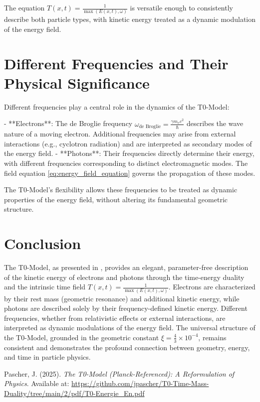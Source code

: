 \documentclass[12pt,a4paper]{article}
\begin{document}
	The equation \( T(x,t) = \frac{1}{\max(E(x,t), \omega)} \) is versatile enough to consistently describe both particle types, with kinetic energy treated as a dynamic modulation of the energy field.
	
	\section{Different Frequencies and Their Physical Significance}
	\label{sec:frequencies}
	
	Different frequencies play a central role in the dynamics of the T0-Model:
	
	- **Electrons**: The de Broglie frequency \(\omega_{\text{de Broglie}} = \frac{\gamma m_e c^2}{\hbar}\) describes the wave nature of a moving electron. Additional frequencies may arise from external interactions (e.g., cyclotron radiation) and are interpreted as secondary modes of the energy field.
	- **Photons**: Their frequencies directly determine their energy, with different frequencies corresponding to distinct electromagnetic modes. The field equation \eqref{eq:energy_field_equation} governs the propagation of these modes.
	
	The T0-Model's flexibility allows these frequencies to be treated as dynamic properties of the energy field, without altering its fundamental geometric structure.
	
	\section{Conclusion}
	\label{sec:summary}
	
	The T0-Model, as presented in \cite{pascher_t0_energy_2025}, provides an elegant, parameter-free description of the kinetic energy of electrons and photons through the time-energy duality and the intrinsic time field \( T(x,t) = \frac{1}{\max(E(x,t), \omega)} \). Electrons are characterized by their rest mass (geometric resonance) and additional kinetic energy, while photons are described solely by their frequency-defined kinetic energy. Different frequencies, whether from relativistic effects or external interactions, are interpreted as dynamic modulations of the energy field. The universal structure of the T0-Model, grounded in the geometric constant \(\xi = \frac{4}{3} \times 10^{-4}\), remains consistent and demonstrates the profound connection between geometry, energy, and time in particle physics.
	
	\newpage
	\begin{thebibliography}{9}
		Pascher, J. (2025). \textit{The T0-Model (Planck-Referenced): A Reformulation of Physics}. Available at: \url{https://github.com/jpascher/T0-Time-Mass-Duality/tree/main/2/pdf/T0-Energie_En.pdf}
	\end{thebibliography}
	
\end{document}
